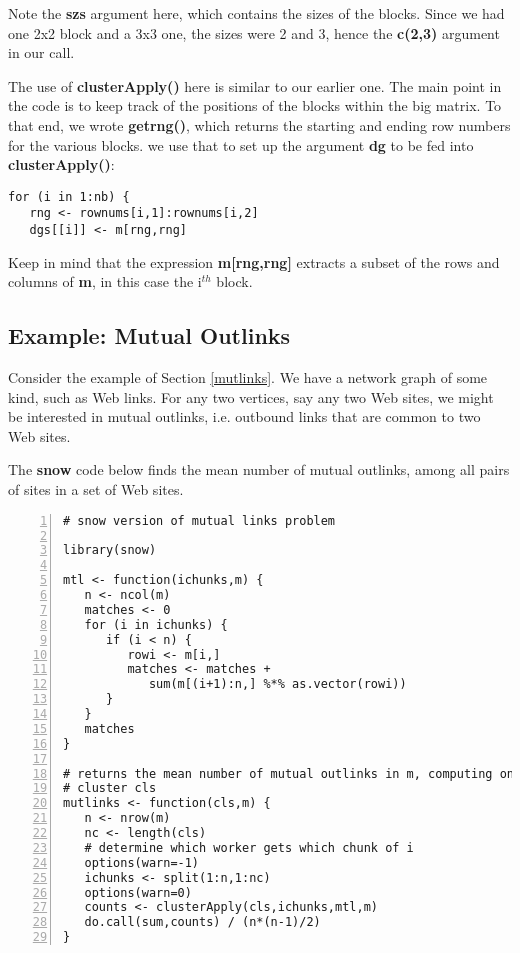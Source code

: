 Note the {\bf szs} argument here, which contains the sizes of the
blocks.  Since we had one 2x2 block and a 3x3 one, the sizes were 2 and
3, hence the {\bf c(2,3)} argument in our call.  

The use of {\bf clusterApply()} here is similar to our earlier one.  The
main point in the code is to keep track of the positions of the blocks
within the big matrix.  To that end, we wrote {\bf getrng()}, which
returns the starting and ending row numbers for the various blocks.  we
use that to set up the argument {\bf dg} to be fed into {\bf
clusterApply()}:

\begin{lstlisting}
for (i in 1:nb) {
   rng <- rownums[i,1]:rownums[i,2]
   dgs[[i]] <- m[rng,rng]
\end{lstlisting}

Keep in mind that the expression {\bf m[rng,rng]} extracts a subset
of the rows and columns of {\bf m}, in this case the i$^{th}$ block.

\subsection{Example:  Mutual Outlinks}
\label{rmutlinks}

Consider the example of Section \ref{mutlinks}.  We have
a network graph of some kind, such as Web links.  For any two
vertices, say any two Web sites, we might be interested in mutual
outlinks, i.e. outbound links that are common to two Web sites.

The {\bf snow} code below finds the mean number of mutual outlinks, among
all pairs of sites in a set of Web sites.

\begin{lstlisting}[numbers=left]
# snow version of mutual links problem

library(snow)

mtl <- function(ichunks,m) {
   n <- ncol(m)
   matches <- 0
   for (i in ichunks) {
      if (i < n) {
         rowi <- m[i,]
         matches <- matches +
            sum(m[(i+1):n,] %*% as.vector(rowi))
      }
   }
   matches
}

# returns the mean number of mutual outlinks in m, computing on the
# cluster cls
mutlinks <- function(cls,m) {
   n <- nrow(m)
   nc <- length(cls)
   # determine which worker gets which chunk of i
   options(warn=-1)
   ichunks <- split(1:n,1:nc)
   options(warn=0)
   counts <- clusterApply(cls,ichunks,mtl,m)
   do.call(sum,counts) / (n*(n-1)/2)
}
\end{lstlisting}

